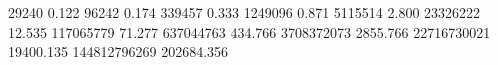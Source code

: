 29240        0.122
96242        0.174
339457       0.333
1249096      0.871
5115514      2.800
23326222     12.535
117065779    71.277
637044763    434.766
3708372073   2855.766
22716730021  19400.135
144812796269 202684.356
